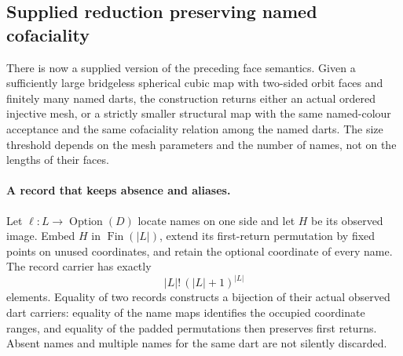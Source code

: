 \subsection{Supplied reduction preserving named cofaciality}
\label{sec:supplied-named-cofacial-reduction}

There is now a supplied version of the preceding face semantics. Given a
sufficiently large bridgeless spherical cubic map with two-sided orbit
faces and finitely many named darts, the construction returns either an
actual ordered injective mesh, or a strictly smaller structural map with
the same named-colour acceptance and the same cofaciality relation among
the named darts. The size threshold depends on the mesh parameters and
the number of names, not on the lengths of their faces.

\paragraph{A record that keeps absence and aliases.}
Let $\ell:L\to\operatorname{Option}(D)$ locate names on one side and
let $H$ be its observed image. Embed $H$ in $\operatorname{Fin}(|L|)$,
extend its first-return permutation by fixed points on unused coordinates,
and retain the optional coordinate of every name. The record carrier has
exactly
\[
 |L|!\,(|L|+1)^{|L|}
\]
elements. Equality of two records constructs a bijection of their actual
observed dart carriers: equality of the name maps identifies the occupied
coordinate ranges, and equality of the padded permutations then preserves
first returns. Absent names and multiple names for the same dart are not
silently discarded.

